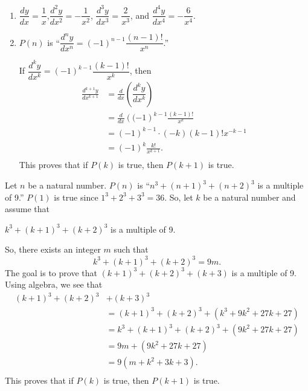\item \begin{enumerate}
\item $\dfrac{{dy}}{{dx}} = \dfrac{1}{x}$,$\dfrac{{d^2 y}}{{dx^2 }} = -\dfrac{1}{x^2}$,
$\dfrac{{d^3 y}}{{dx^3 }} = \dfrac{2}{x^3}$, and $\dfrac{{d^4 y}}{{dx^4 }} = -\dfrac{6}{x^4}$.

\item $P \left( n \right)$ is 
``$\dfrac{{d^n y}}{{dx^n }} = \left( -1 \right)^{n-1} \dfrac{ \left( n - 1 \right)!}{x^n}$.''

If $\dfrac{{d^k y}}{{dx^k }} = \left( -1 \right)^{k-1} \dfrac{ \left( k - 1 \right)!}{x^k}$, then 
\[
\begin{aligned}
\frac{{d^{k+1} y}}{{dx^{k+1} }} &= \frac{d}{dx} \left( \dfrac{{d^k y}}{{dx^k }} \right) \\
  &= \frac{d}{dx} \left( ( -1 \right)^{k-1} \frac{ \left( k - 1 \right)!}{x^k} \\
  &=  \left( -1 \right)^{k-1} \cdot \left( -k \right) \left( k - 1 \right)! x^{-k-1} \\
  &=  \left( -1 \right)^k \frac{k!}{x^{k+1}}. \\
\end{aligned}
\]
This proves that if $P \left( k \right)$ is true, then $P \left( k + 1 \right)$ is true.
\end{enumerate}



\item Let $n$ be a natural number.  $P \left( n \right)$ is 
``$n^3 + \left( n+1 \right)^3 + \left( n+2 \right)^3$ is a multiple of 9.''  $P \left( 1 \right)$ is true since $1^3 + 2^3 + 3^3 = 36$.  So, let $k$ be a natural number and assume that
\begin{center}
$k^3 + \left( k + 1 \right)^3 + \left( k + 2 \right)^3$ is a multiple of 9.
\end{center}
So, there exists an integer $m$ such that
\[
k^3 + \left( k + 1 \right)^3 + \left( k + 2 \right)^3 = 9m.
\]
The goal is to prove that 
$\left( k + 1 \right)^3 + \left( k + 2 \right)^3 + \left( k + 3 \right)$ is a multiple of 9.  Using algebra, we see that
\[
\begin{aligned}
\left( k + 1 \right)^3 + \left( k + 2 \right)^3 &+ \left( k + 3 \right)^3 \\
  &= \left( k + 1 \right)^3 + \left( k + 2 \right)^3 + \left( k^3 + 9k^2 + 27k + 27 \right) \\
  &= k^3 + \left( k + 1 \right)^3 + \left( k + 2 \right)^3 + \left( 9k^2 + 27k + 27 \right) \\
  &= 9m + \left( 9k^2 + 27k + 27 \right) \\
  &= 9 \left( m + k^2 + 3k + 3 \right). \\
\end{aligned}
\]
This proves that if $P \left( k \right)$ is true, then $P \left( k + 1 \right)$ is true.




